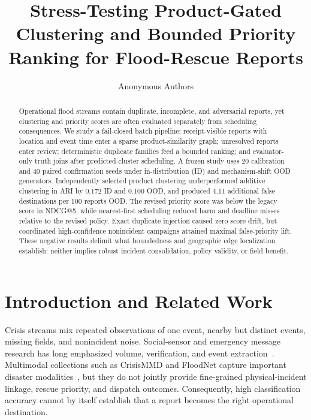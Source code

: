 \documentclass[runningheads]{llncs}
\begin{document}
\title{Stress-Testing Product-Gated Clustering and Bounded Priority
Ranking for Flood-Rescue Reports}

\author{Anonymous Authors}

\maketitle

\begin{abstract}
Operational flood streams contain duplicate, incomplete, and adversarial
reports, yet clustering and priority scores are often evaluated separately
from scheduling consequences. We study a fail-closed batch pipeline:
receipt-visible reports with location and event time enter a sparse
product-similarity graph; unresolved reports enter review; deterministic
duplicate families feed a bounded ranking; and evaluator-only truth joins
after predicted-cluster scheduling. A frozen study uses 20 calibration and 40
paired confirmation seeds under in-distribution (ID) and mechanism-shift OOD
generators. Independently selected product clustering underperformed additive
clustering in ARI by 0.172 ID and 0.100 OOD, and produced 4.11 additional false
destinations per 100 reports OOD. The revised priority score was below the
legacy score in NDCG@5, while nearest-first scheduling reduced harm and
deadline misses relative to the revised policy. Exact duplicate injection
caused zero score drift, but coordinated high-confidence nonincident campaigns
attained maximal false-priority lift. These negative results delimit what
boundedness and geographic edge localization establish: neither implies robust
incident consolidation, policy validity, or field benefit.
\end{abstract}

\section{Introduction and Related Work}

Crisis streams mix repeated observations of one event, nearby but distinct
events, missing fields, and nonincident noise. Social-sensor and emergency
message research has long emphasized volume, verification, and event
extraction~\cite{sakaki2010earthquake,atefeh2015survey,imran2015processing}. Multimodal
collections such as CrisisMMD and FloodNet capture important disaster
modalities~\cite{alam2018crisismmd,rahnemoonfar2021floodnet}, but they do not
jointly provide fine-grained physical-incident linkage, rescue priority, and
dispatch outcomes. Consequently, high classification accuracy cannot by
itself establish that a report becomes the right operational destination.
\end{document}
